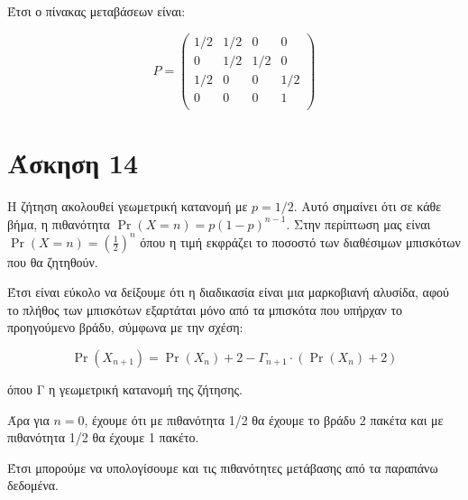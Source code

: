 \documentclass[11pt,a4paper]{article}
\begin{document}
Έτσι ο πίνακας μεταβάσεων είναι:

\begin{equation*}
    P = 
    \begin{pmatrix}
        1/2 & 1/2 & 0   & 0   \\
        0   & 1/2 & 1/2 & 0   \\
        1/2 & 0   & 0   & 1/2 \\
        0   & 0   & 0   & 1   \\
    \end{pmatrix}
\end{equation*}

\section*{Άσκηση 14}

Η ζήτηση ακολουθεί γεωμετρική κατανομή με $p=1/2$. Αυτό σημαίνει ότι σε κάθε βήμα, η πιθανότητα $\Pr(X=n) = p(1-p)^{n-1}$. Στην περίπτωση μας είναι $\Pr(X=n) = (\frac{1}{2})^n$ όπου η τιμή εκφράζει το ποσοστό των διαθέσιμων μπισκότων που θα ζητηθούν. 

Έτσι είναι εύκολο να δείξουμε ότι η διαδικασία είναι μια μαρκοβιανή αλυσίδα, αφού το πλήθος των μπισκότων εξαρτάται μόνο από τα μπισκότα που υπήρχαν το προηγούμενο βράδυ, σύμφωνα με την σχέση:

\begin{equation*}
    \Pr(X_{n+1}) = \Pr(X_n) + 2 - Γ_{n+1} \cdot (\Pr(X_n) + 2)
\end{equation*}

όπου Γ η γεωμετρική κατανομή της ζήτησης.

Άρα για $n=0$, έχουμε ότι με πιθανότητα 1/2 θα έχουμε το βράδυ 2 πακέτα και με πιθανότητα 1/2 θα έχουμε 1 πακέτο. 

Έτσι μπορούμε να υπολογίσουμε και τις πιθανότητες μετάβασης από τα παραπάνω δεδομένα. 
\end{document}
